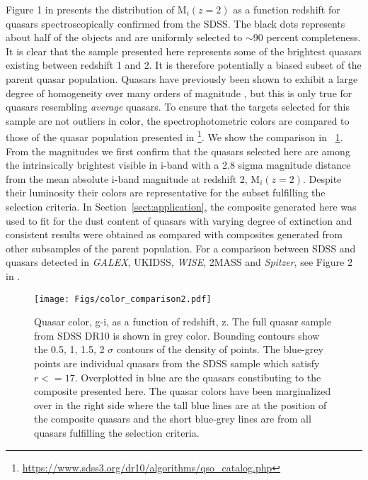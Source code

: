 \documentclass{aa}    %
\newcommand{\figref}[1]{\ref{fig:#1}}
\newcommand{\Fig}[1]{\figurename~\figref{#1}}
\newcommand{\fig}[1]{\Fig{#1}}
\newcommand{\figlabel}[1]{\label{fig:#1}}
\newcommand{\sectionname}{Section}
\newcommand{\Sect}[1]{\sectionname~\ref{sect:#1}}
\newcommand{\sect}[1]{\Sect{#1}}
\begin{document}
Figure 1 in \cite{Shen2011} presents the distribution of M$_i(z=2)$ as a function redshift for quasars spectroscopically confirmed from the SDSS. The black dots represents about half of the objects and are uniformly selected to $\sim$90 percent completeness\citep{Richards2002, VandenBerk2005}. It is clear that the sample presented here represents some of the brightest quasars existing between redshift 1 and 2. It is therefore potentially a biased subset of the parent quasar population. Quasars have previously been shown to exhibit a large degree of homogeneity over many orders of magnitude \citep{Dietrich2002}, but this is only true for quasars resembling \textit{average} quasars. To ensure that the targets selected for this sample are not outliers in color, the spectrophotometric colors are compared to those of the quasar population presented in \citet{Paris2014}\footnote{\url{https://www.sdss3.org/dr10/algorithms/qso_catalog.php}}. We show the comparison in \fig{color_comparison}. From the magnitudes we first confirm that the quasars selected here are among the intrinsically brightest visible in i-band with a 2.8 sigma magnitude distance from the mean absolute i-band magnitude at redshift 2, M$_i(z=2)$. Despite their luminosity their colors are representative for the subset fulfilling the selection criteria. In \sect{application}, the composite generated here was used to fit for the dust content of quasars with varying degree of extinction and consistent results were obtained as compared with composites generated from other subsamples of the parent population. For a comparison between SDSS and quasars detected in \textit{GALEX}, UKIDSS, \textit{WISE}, 2MASS and \textit{Spitzer}, see Figure 2 in \cite{Krawczyk2013}.


 \begin{figure}[hbtp]
   \centering
   \texttt{[image: Figs/color\_comparison2.pdf]}
   \caption[]{Quasar color, g-i,  as a function of redshift, z. The full quasar sample from SDSS DR10 \citep{Paris2014} is shown in grey color. Bounding contours show the 0.5, 1, 1.5, 2 $\sigma$ contours of the density of points. The blue-grey points are individual quasars from the SDSS sample which satisfy $r <= 17$. Overplotted in blue are the quasars constibuting to the composite presented here. The quasar colors have been marginalized over in the right side where the tall blue lines are at the position of the composite quasars and the short blue-grey lines are from all quasars fulfilling the selection criteria.}
  \figlabel{color_comparison}
 \end{figure}
\end{document}
